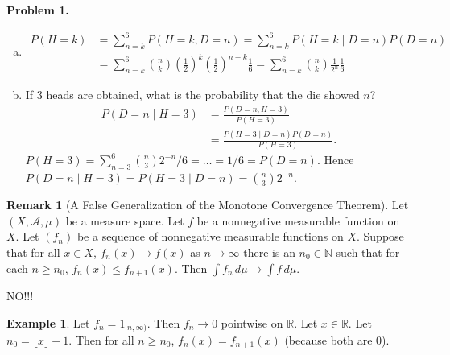 \documentclass{article}
\newcommand{\R}{\mathbb{R}}
\newcommand{\N}{\mathbb{N}}
\theoremstyle{definition}
\newtheorem*{example}{Example}
\newtheorem*{remark}{Remark}
\begin{document}
\textbf{Problem 1.}
\begin{enumerate}[(a)]
    \item \begin{align*}
        P(H = k) &= \sum_{n = k}^6 P(H = k, D = n) = \sum_{n = k}^6 P(H = k \mid D = n)P(D = n) \\
        &= \sum_{n = k}^6 \binom{n}{k}\left(\frac{1}{2}\right)^k \left(\frac{1}{2}\right)^{n-k} \frac{1}{6} = \sum_{n = k}^6 \binom{n}{k}\frac{1}{2^n}\frac{1}{6}
    \end{align*}
    \item If $3$ heads are obtained, what is the probability that the die showed $n$?
    \begin{align*}
        P(D = n \mid H = 3) &= \frac{P(D = n, H = 3)}{P(H = 3)} \\
        &= \frac{P(H = 3 \mid D = n)P(D = n)}{P(H = 3)}.
    \end{align*}
    $P(H = 3) = \sum_{n = 3}^6 \binom{n}{3}2^{-n}/6 = \dots = 1/6 = P(D = n)$. Hence $P(D = n \mid H = 3) = P(H = 3 \mid D = n) = \binom{n}{3}2^{-n}$.
\end{enumerate}

\begin{remark}[A False Generalization of the Monotone Convergence Theorem]
Let $(X, \mathscr{A}, \mu)$ be a measure space. Let $f$ be a nonnegative measurable function on $X$. Let $(f_n)$ be a sequence of nonnegative measurable functions on $X$. Suppose that for all $x \in X$, $f_n(x) \to f(x)$ as $n \to \infty$ there is an $n_0 \in \N$ such that for each $n \geq n_0$, $f_n(x) \leq f_{n+1}(x)$. Then $\int f_n \,d\mu \to \int f \,d\mu$.
\begin{center}
    \Huge{NO!!!}
\end{center}
\end{remark}
\begin{example}
Let $f_n = 1_{[n, \infty)}$. Then $f_n \to 0$ pointwise on $\R$. Let $x \in \R$. Let $n_0 = \lfloor x \rfloor + 1$. Then for all $n \geq n_0$, $f_n(x) = f_{n+1}(x)$ (because both are $0$).
\end{example}
\end{document}
